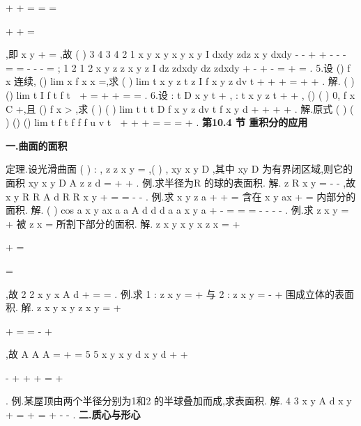 +
+
=
\Rightarrow =
\Rightarrow 
=

+
+
=

,即
x
y
+
=
,故 
(
)
3 4
3 4
2 1
x
y
x
y
x
y
x
y
I
dxdy
zdz
x
y
dxdy
\pi 
-
-
+
\le 
+
\le 
-
-
-
=
=
-
-
-
=
\int \int 
\int 
\int \int 
; 
1 2
1 2
x
y
z z
x
y
z
I
dz
zdxdy
dz
zdxdy
\pi 
+
\le 
-
+
\le -
=
+
=
\int 
\int \int 
\int 
\int \int 
. 
5.设
()
f x 连续,
()
lim
x
f x
x
\to 
=,求
(
)
lim
t
x
y
z
t z
I
f x
y
z
dv
t
+
\to 
+
+
\le 
\cdots 
=
+
+
\int \int \int 
. 
解.
(
)
()
lim
t
I
f
t
f
t
\psi 
\eta 

\pi 
\pi 
+
\to 
=
+
+
\cdots 
=
=
. 
6.设
:
t
D
x
y
t
+
\le 
,
:
t x
y
z
t
\Omega 
+
+
\le 
,
()
(
)
0,
f x
C
\in 
+\infty ,且
()
f x >
,求 
(
)
(
)
lim
t
t
t
D
f x
y
z
dv
t
f x
y
d\sigma 
+
\Omega 
\to 
+
+
+
\int \int \int 
\int \int 
. 
解.原式
(
)
(
)
()
()
lim
t
f
t
f
f
f u
v
t
\psi 

\eta 
\pi 
\pi 
+
\to 
+
+
\cdots 
=
=
\cdots 
=
+
\cdots 
. 
\vspace{6pt}
{\large \bfseries \textcolor{lyred}{第10.4 节 重积分的应用}}

\vspace{4pt}
{\bfseries \textcolor{lyred}{一.曲面的面积}}

\textcolor{lyred}{定理}.设光滑曲面
(
)
:
,
z
z x y
\Sigma 
=
,(
)
,
xy
x y
D
\in 
,其中
xy
D 为有界闭区域,则它的面积 
xy
x
y
D
A
z
z d\sigma 
=
+
+
\int \int 
. 
\textcolor{lyred}{例}.求半径为R 的球的表面积. 
解.
z
R
x
y
=
-
-
,故
x
y
R
R
A
d
R
R
x
y
\sigma 
\pi 
+
\le 
=
=
-
-
\int \int 
. 
\textcolor{lyred}{例}.求
x
y
z
a
+
+
=
含在
x
y
ax
+
=
内部分的面积. 
解.
(
)
cos
a
x
y
ax
a
a
A
d
d
d
a
a
x
y
a
\pi 
\theta 
\pi 
\sigma 
\theta 
\rho \rho 
\pi 
\rho 
+
\le 
-
=
=
\cdots 
=
-
-
-
-
\int \int 
\int 
\int 
. 
\textcolor{lyred}{例}.求
z
x
y
=
+
被
z
x
=
所割下部分的面积. 
解.
z
x
y
x
y
x
z
x
=
+

\Rightarrow 
+
=

=

,故
2 2
x
y
x
A
d\sigma 
\pi 
+
\le 
=
\cdots 
=
\int \int 
. 
\textcolor{lyred}{例}.求
1 : z
x
y
\Sigma 
=
+
与
2 :
z
x
y
\Sigma 
=
-
+
围成立体的表面积. 
解.
z
x
y
x
y
z
x
y
=
+

\Rightarrow 
+
=
=
-
+

,故
A
A
A
=
+
= 
5 5
x
y
x
y
d
x
y d
\sigma 
\sigma 
\pi 
+
\le 
+
\le 


-
+
+
+
=
+






\int \int 
\int \int 
. 
\textcolor{lyred}{例}.某屋顶由两个半径分别为1和2 的半球叠加而成,求表面积. 
解.
4 3
x
y
A
d
x
y
\pi 
\sigma 
\pi 
\pi 
\le 
+
\le 
=
+
=
+
-
-
\int \int 
. 
\vspace{4pt}
{\bfseries \textcolor{lyred}{二.质心与形心}}

